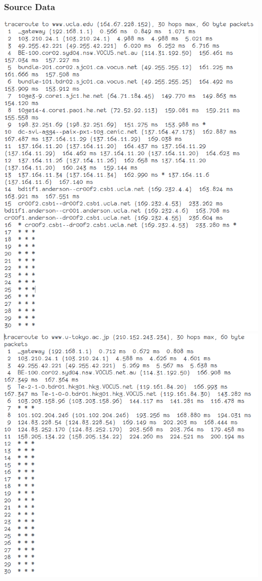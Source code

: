 \documentclass{article}
\begin{document}
\subsubsection{Source Data}
\includegraphics[width=\textwidth]{img/tr_ulca.png}
\includegraphics[width=\textwidth]{img/tr_u_tokyo.png}
\end{document}
